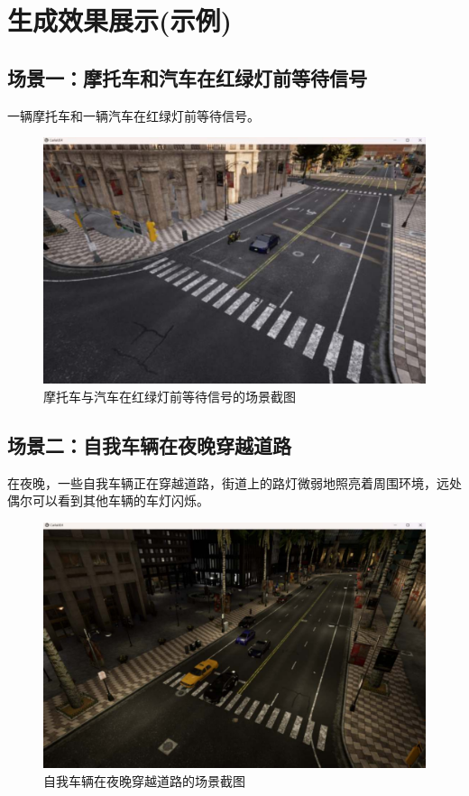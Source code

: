 \section{生成效果展示(示例)}

\subsection{场景一：摩托车和汽车在红绿灯前等待信号}
\indent 一辆摩托车和一辆汽车在红绿灯前等待信号。\\

\begin{figure}[H]
	\centering
	\includegraphics[width=1.0\textwidth]{"images/1.pdf"}
	\caption{摩托车与汽车在红绿灯前等待信号的场景截图}
	\label{fig:redlight_motorbike_car}
\end{figure}

\subsection{场景二：自我车辆在夜晚穿越道路}
\indent 在夜晚，一些自我车辆正在穿越道路，街道上的路灯微弱地照亮着周围环境，远处偶尔可以看到其他车辆的车灯闪烁。\\

\begin{figure}[H]
	\centering
	\includegraphics[width=1.0\textwidth]{"images/2.pdf"}
	\caption{自我车辆在夜晚穿越道路的场景截图}
	\label{fig:night_self_driving_cross}
\end{figure}

